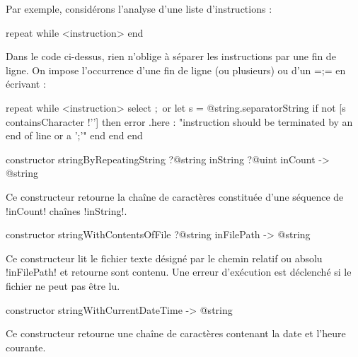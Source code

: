 Par exemple, considérons l'analyse d'une liste d'instructions :

\begin{galgas3}
repeat
while
  <instruction>
end
\end{galgas3}

Dans le code ci-dessus, rien n'oblige à séparer les instructions par une fin de ligne. On impose l'occurrence d'une fin de ligne (ou plusieurs) ou d'un \ggst=;= en écrivant :

\begin{galgas3}
repeat
while
  <instruction>
  select
   $;$
  or
    let s = @string.separatorString
    if not [s containsCharacter !'\n'] then
      error .here
       : "instruction should be terminated by an end of line or a ';'"
    end
  end
end
\end{galgas3}




\begin{galgas3box}
constructor stringByRepeatingString
  ?@string inString
  ?@uint inCount
  -> @string
\end{galgas3box}

Ce constructeur retourne la chaîne de caractères constituée d'une séquence de \ggst!inCount! chaînes \ggst!inString!.









\begin{galgas3box}
constructor stringWithContentsOfFile ?@string inFilePath -> @string
\end{galgas3box}

Ce constructeur lit le fichier texte désigné par le chemin relatif ou absolu \ggst!inFilePath! et retourne sont contenu. Une erreur d'exécution est déclenché si le fichier ne peut pas être lu.







\begin{galgas3box}
constructor stringWithCurrentDateTime -> @string
\end{galgas3box}

Ce constructeur retourne une chaîne de caractères contenant la date et l'heure courante.

